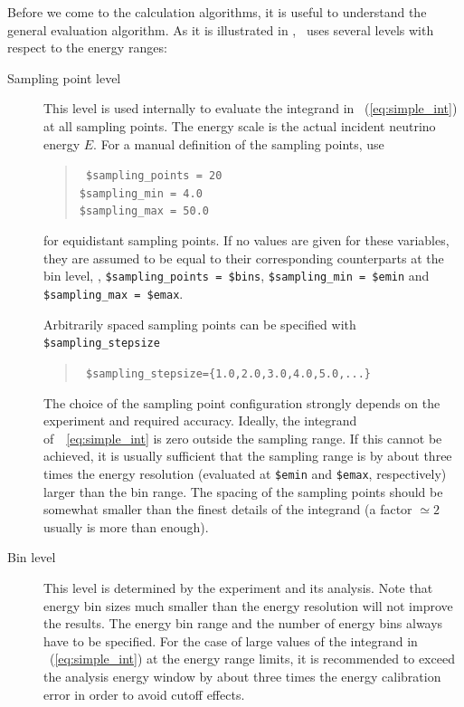 Before we come to the calculation algorithms, it is useful to understand
the general evaluation algorithm. As it is illustrated in , 
\GLOBES\ uses several levels with respect to the energy ranges:
\begin{description}
\item[Sampling point level]
 This level is used internally to evaluate the integrand in \eq~(\ref{eq:simple_int}) at all sampling points. The energy scale is the actual incident neutrino energy $E$. 
For a manual definition of the sampling points, use
\begin{quote}
{\tt
\$sampling\_points = 20\\
\$sampling\_min =          4.0\\
\$sampling\_max =         50.0
}
\end{quote}
for equidistant sampling points. If no values are given for these variables,
they are assumed to be equal to their corresponding counterparts at the bin level,
\ie , \verb+$sampling_points = $bins+, \verb+$sampling_min = $emin+ and
\verb+$sampling_max = $emax+.


Arbitrarily spaced sampling points can 
be specified with 
{\tt \$sampling\_stepsize}
\begin{quote}
{\tt
\$sampling\_stepsize=\{1.0,2.0,3.0,4.0,5.0,...\}
}
\end{quote}
The choice of the sampling point configuration strongly depends on the 
experiment and required accuracy. Ideally, the integrand 
of~\eq~\ref{eq:simple_int} is zero outside the sampling range. If this cannot
be achieved, it is usually sufficient that the sampling range is by about
three times the energy resolution (evaluated at {\tt \$emin} and
{\tt \$emax}, respectively) larger than the bin range. 
The spacing of the sampling points should be somewhat smaller than the 
finest details of the integrand (a factor 
$\simeq 2$ usually is more than enough).



\item[Bin level] This level is determined by the experiment and its analysis. 
Note that energy
bin sizes much smaller than the energy resolution will not improve the results. The energy bin range and the number of energy bins always have to be specified. For the case of large values of the integrand in \eq~(\ref{eq:simple_int}) at the energy range limits, it is recommended to exceed the analysis energy window by about three times the energy calibration error in order 
to avoid cutoff effects.


\end{description}

